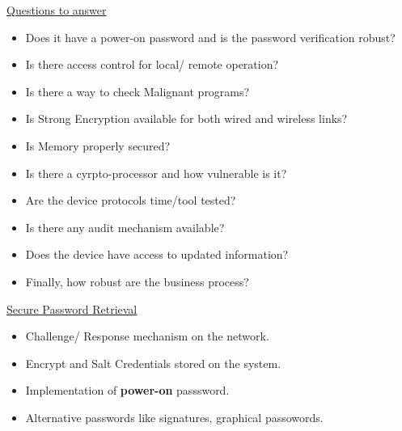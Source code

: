 \documentclass{slides}
\begin{document}
\begin{slide}
\begin{center}
\underline{Questions to answer}
\end{center}
\small
\begin{itemize}
\item Does it have a power-on password and is the password verification robust?
\item Is there access control for local/ remote operation?
\item Is there a way to check Malignant programs?
\item Is Strong Encryption available for both wired and wireless links?
\item Is Memory properly secured?
\item Is there a cyrpto-processor and how vulnerable is it?
\item Are the device protocols time/tool tested?
\item Is there any audit mechanism available?
\item Does the device have access to updated information?
\item Finally, how robust are the business process?
\end{itemize}
\end{slide}

\begin{slide}
\begin{center}
\underline{Secure Password Retrieval}
\end{center}
\small
\begin{itemize}\addtolength{\itemsep}{-0.5\baselineskip}
\item Challenge/ Response mechanism on the network.
\item Encrypt and Salt Credentials stored on the system.
\item Implementation of {\bf power-on} passsword.
\item Alternative passwords like signatures, graphical passowords.
\end {itemize}
\end{slide}
\end{document}
